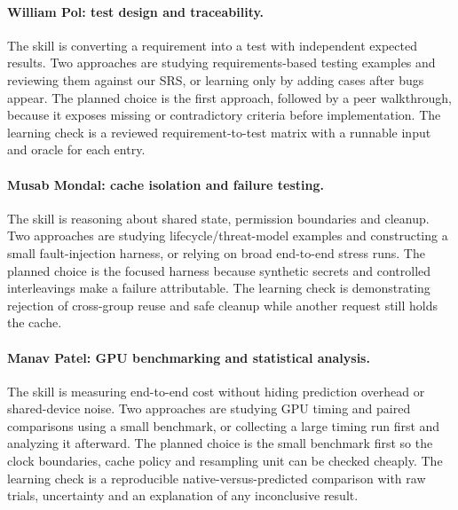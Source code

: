 \documentclass[12pt, titlepage]{article}
\begin{document}
\paragraph{William Pol: test design and traceability.}
The skill is converting a requirement into a test with independent expected results. Two approaches are studying requirements-based testing examples and reviewing them against our SRS, or learning only by adding cases after bugs appear. The planned choice is the first approach, followed by a peer walkthrough, because it exposes missing or contradictory criteria before implementation. The learning check is a reviewed requirement-to-test matrix with a runnable input and oracle for each entry.

\paragraph{Musab Mondal: cache isolation and failure testing.}
The skill is reasoning about shared state, permission boundaries and cleanup. Two approaches are studying lifecycle/threat-model examples and constructing a small fault-injection harness, or relying on broad end-to-end stress runs. The planned choice is the focused harness because synthetic secrets and controlled interleavings make a failure attributable. The learning check is demonstrating rejection of cross-group reuse and safe cleanup while another request still holds the cache.

\paragraph{Manav Patel: GPU benchmarking and statistical analysis.}
The skill is measuring end-to-end cost without hiding prediction overhead or shared-device noise. Two approaches are studying GPU timing and paired comparisons using a small benchmark, or collecting a large timing run first and analyzing it afterward. The planned choice is the small benchmark first so the clock boundaries, cache policy and resampling unit can be checked cheaply. The learning check is a reproducible native-versus-predicted comparison with raw trials, uncertainty and an explanation of any inconclusive result.
\end{document}
